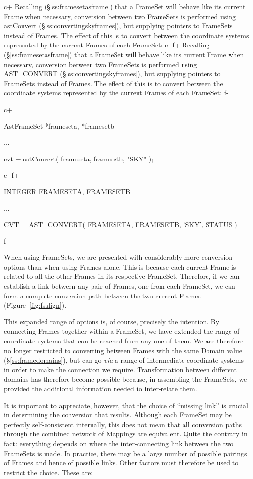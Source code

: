 \documentclass[twoside,11pt]{starlink}
\providecommand{\secref}[1]{\S\ref{#1}}
\begin{document}
{c+
Recalling (\secref{ss:framesetasframe}) that a FrameSet will behave
like its current Frame when necessary, conversion between two
FrameSets is performed using astConvert
(\secref{ss:convertingskyframes}), but supplying pointers to FrameSets
instead of Frames. The effect of this is to convert between the
coordinate systems represented by the current Frames of each FrameSet:
c-
f+
Recalling (\secref{ss:framesetasframe}) that a FrameSet will behave
like its current Frame when necessary, conversion between two
FrameSets is performed using AST\_CONVERT
(\secref{ss:convertingskyframes}), but supplying pointers to FrameSets
instead of Frames. The effect of this is to convert between the
coordinate systems represented by the current Frames of each FrameSet:
f-

c+
\small
\begin{terminalv}
AstFrameSet *frameseta, *framesetb;

...

cvt = astConvert( frameseta, framesetb, "SKY" );
\end{terminalv}
\normalsize
c-
f+
\small
\begin{terminalv}
      INTEGER FRAMESETA, FRAMESETB

      ...

      CVT = AST_CONVERT( FRAMESETA, FRAMESETB, 'SKY', STATUS )
\end{terminalv}
\normalsize
f-

When using FrameSets, we are presented with considerably more
conversion options than when using Frames alone. This is because each
current Frame is related to all the other Frames in its respective
FrameSet. Therefore, if we can establish a link between any pair of
Frames, one from each FrameSet, we can form a complete conversion path
between the two current Frames (Figure~\ref{fig:fsalign}).

This expanded range of options is, of course, precisely the
intention. By connecting Frames together within a FrameSet, we have
extended the range of coordinate systems that can be reached from any
one of them.  We are therefore no longer restricted to converting
between Frames with the same Domain value (\secref{ss:framedomains}),
but can go \emph{via} a range of intermediate coordinate systems in
order to make the connection we require. Transformation between
different domains has therefore become possible because, in assembling
the FrameSets, we provided the additional information needed to
inter-relate them.

It is important to appreciate, however, that the choice of ``missing
link'' is crucial in determining the conversion that results.
Although each FrameSet may be perfectly self-consistent internally,
this does not mean that all conversion paths through the combined
network of Mappings are equivalent. Quite the contrary in fact:
everything depends on where the inter-connecting link between the two
FrameSets is made.  In practice, there may be a large number of
possible pairings of Frames and hence of possible links. Other factors
must therefore be used to restrict the choice. These are:

}
\end{document}
